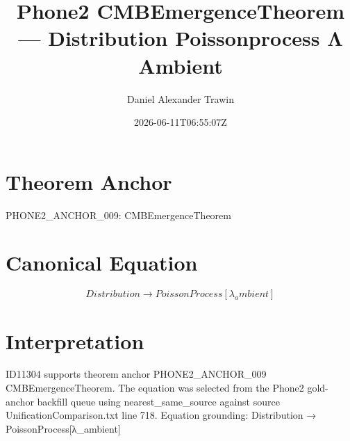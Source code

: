 \documentclass[11pt]{article}
\title{Phone2 CMBEmergenceTheorem — Distribution Poissonprocess Λ Ambient}
\author{Daniel Alexander Trawin}
\date{2026-06-11T06:55:07Z}
\begin{document}
\maketitle
\section*{Theorem Anchor}
PHONE2_ANCHOR_009: CMBEmergenceTheorem
\section*{Canonical Equation}
\[
Distribution → PoissonProcess[λ_ambient]
\]
\section*{Interpretation}
ID11304 supports theorem anchor PHONE2_ANCHOR_009 CMBEmergenceTheorem. The equation was selected from the Phone2 gold-anchor backfill queue using nearest_same_source against source UnificationComparison.txt line 718. Equation grounding: Distribution → PoissonProcess[λ_ambient]
\end{document}
